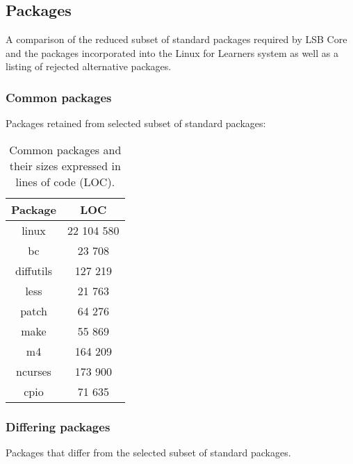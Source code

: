 \subsection{Packages}\label{Packages}

A comparison of the reduced subset of standard packages required by LSB Core and the packages incorporated into the Linux for Learners system as well as a listing of rejected alternative packages.

\subsubsection{Common packages}

Packages retained from selected subset of standard packages:

\begin{table}[!h]
    \centering
    \begin{tabular}{|c||c|}
        \hline
        Package & LOC \\
        \hline
        \hline
        linux \cite{linux} & 22 104 580 \\
        \hline
        bc \cite{bc} & 23 708 \\
        \hline        
        diffutils \cite{diffutils} & 127 219 \\
        \hline
        less \cite{less} & 21 763 \\
        \hline
        patch \cite{patch} & 64 276 \\
        \hline
        make \cite{make} & 55 869 \\
        \hline
        m4 \cite{m4} & 164 209 \\
        \hline
        ncurses \cite{ncurses} & 173 900 \\
        \hline
        cpio \cite{cpio} & 71 635 \\
        \hline
    \end{tabular}
    \caption{Common packages and their sizes expressed in lines of code (LOC).}
\end{table}

\newpage

\subsubsection{Differing packages}

Packages that differ from the selected subset of standard packages.

